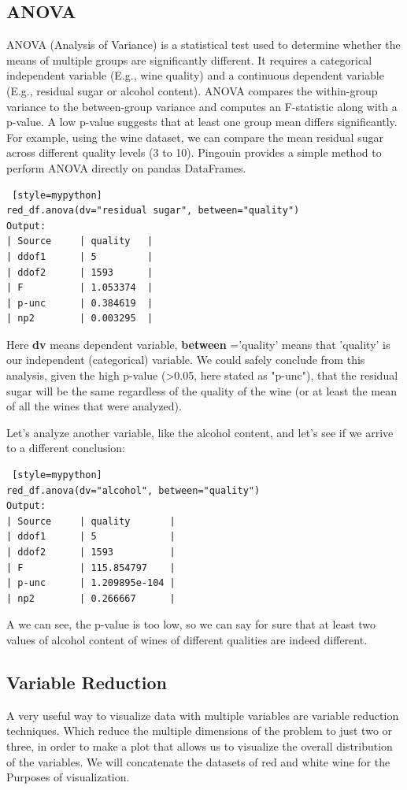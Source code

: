 \subsection{ANOVA}
ANOVA (Analysis of Variance) is a statistical test used to determine whether the means of multiple groups are significantly different. It requires a categorical independent variable (E.g., wine quality) and a continuous dependent variable (E.g., residual sugar or alcohol content). ANOVA compares the within-group variance to the between-group variance and computes an F-statistic along with a p-value. A low p-value suggests that at least one group mean differs significantly. For example, using the wine dataset, we can compare the mean residual sugar across different quality levels (3 to 10). Pingouin provides a simple method to perform ANOVA directly on pandas DataFrames.
\begin{lstlisting} [style=mypython]
red_df.anova(dv="residual sugar", between="quality")
Output:
| Source     | quality   |
| ddof1      | 5         |
| ddof2      | 1593      |
| F          | 1.053374  |
| p-unc      | 0.384619  |
| np2        | 0.003295  |
\end{lstlisting}
Here \textbf{dv} means dependent variable, \textbf{between }='quality' means that 'quality' is our independent (categorical) variable.
We could safely conclude from this analysis, given the high p-value (>0.05, here stated as "p-unc"), that the residual sugar will be the same regardless of the quality of the wine (or at least the mean of all the wines that were analyzed).

Let's analyze another variable, like the alcohol content, and let's see if we arrive to a different conclusion:
\begin{lstlisting} [style=mypython]
red_df.anova(dv="alcohol", between="quality")
Output:
| Source     | quality       |
| ddof1      | 5             |
| ddof2      | 1593          |
| F          | 115.854797    |
| p-unc      | 1.209895e-104 |
| np2        | 0.266667      |
\end{lstlisting}
A we can see, the p-value is too low, so we can say for sure that at least two values of alcohol content of wines of different qualities are indeed different.


\subsection{Variable Reduction}
A very useful way to visualize data with multiple variables are variable reduction techniques. Which reduce the multiple dimensions of the problem to just two or three, in order to make a plot that allows us to visualize the overall distribution of the variables.
We will concatenate the datasets of red and white wine for the Purposes of visualization.

